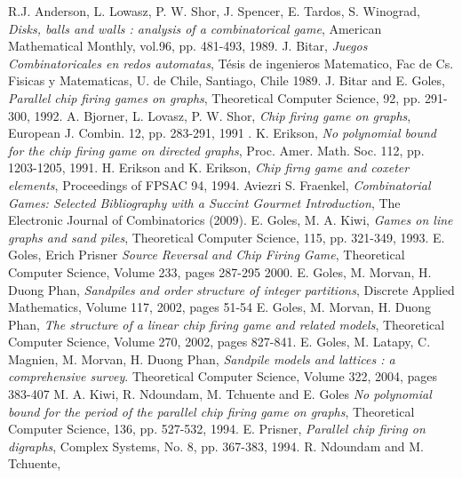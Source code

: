 \documentclass{article}
\begin{document}


\begin{thebibliography}{AND 89}
 R.J. Anderson, L. Lowasz, P. W. Shor, J. Spencer, E. Tardos,
 S. Winograd,
 {\it Disks, balls and walls : analysis of a combinatorical game},
 American Mathematical Monthly, vol.96, pp. 481-493,
 1989.
 J. Bitar,
 {\it Juegos Combinatoricales en redos automatas},
 T\'esis de ingenieros Matematico, Fac de Cs. Fisicas y Matematicas, U. de
 Chile, Santiago, Chile
 1989.
 J. Bitar and E. Goles,
 {\it Parallel chip firing games on graphs},
 Theoretical Computer Science, 92, pp. 291-300,
 1992.
 A. Bjorner, L. Lovasz, P. W. Shor,
 {\it Chip firing game on graphs},
 European J. Combin. 12, pp. 283-291,
 1991 .
 K. Erikson,
 {\it No polynomial bound for the chip firing game on directed graphs},
Proc. Amer. Math. Soc. 112, pp. 1203-1205,
 1991.
 H. Erikson and K. Erikson,
 {\it Chip firng game and coxeter elements},
 Proceedings of FPSAC 94,
 1994.
 Aviezri S. Fraenkel,
 {\it Combinatorial Games: Selected Bibliography with a Succint Gourmet Introduction},
 The Electronic Journal of Combinatorics (2009).
 E. Goles, M. A. Kiwi,
 {\it Games on line graphs and sand piles},
 Theoretical Computer Science, 115, pp. 321-349,
 1993.
 E. Goles, Erich Prisner
 {\it Source Reversal and Chip Firing Game},
 Theoretical Computer Science, Volume 233, pages 287-295
 2000.
 E. Goles, M. Morvan, H. Duong Phan, {\it Sandpiles and order structure of integer partitions},
 Discrete Applied Mathematics, Volume 117, 2002, pages 51-54
 E. Goles, M. Morvan, H. Duong Phan, {\it The structure of a linear chip firing game and related models},
 Theoretical Computer Science, Volume 270, 2002, pages 827-841.
 E. Goles, M. Latapy, C. Magnien, M. Morvan, H. Duong Phan, {\it Sandpile models and lattices : a
 comprehensive survey}. Theoretical Computer Science, Volume 322, 2004, pages 383-407
 M. A. Kiwi, R. Ndoundam, M. Tchuente and E. Goles
 {\it No polynomial bound for the period of the parallel chip firing game on graphs},
 Theoretical Computer Science, 136, pp. 527-532,
 1994.
 E. Prisner,
 {\it Parallel chip firing on digraphs},
Complex Systems, No. 8, pp. 367-383,
 1994.
 R. Ndoundam and M. Tchuente,

\end{thebibliography}
\end{document}
